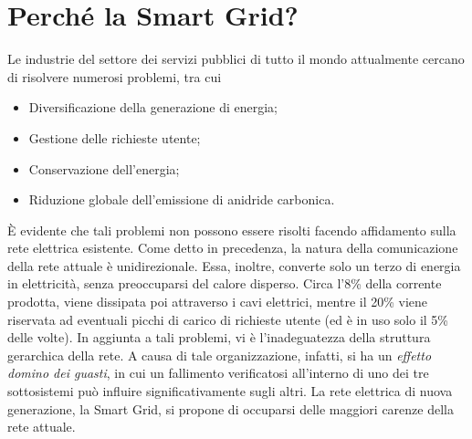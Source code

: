 \section{Perché la Smart Grid?}
Le industrie del settore dei servizi pubblici di tutto il mondo attualmente cercano di risolvere numerosi problemi, tra cui 
\begin{itemize}
\item Diversificazione della generazione di energia;
\item Gestione delle richieste utente;
\item Conservazione dell'energia;
\item Riduzione globale dell'emissione di anidride carbonica.
\end{itemize}
È evidente che tali problemi non possono essere risolti facendo affidamento sulla rete elettrica esistente. \newline
Come detto in precedenza, la natura della comunicazione della rete attuale è unidirezionale. Essa, inoltre, converte solo un terzo di energia in elettricità, senza preoccuparsi del calore disperso. Circa l'8\% della corrente prodotta, viene dissipata poi attraverso i cavi elettrici, mentre il 20\% viene riservata ad eventuali picchi di carico di richieste utente (ed è in uso solo il 5\% delle volte). \newline
In aggiunta a tali problemi, vi è l'inadeguatezza della struttura gerarchica della rete. A causa di tale organizzazione, infatti, si ha un \textit{effetto domino dei guasti}, in cui un fallimento verificatosi all'interno di uno dei tre sottosistemi può influire significativamente sugli altri. \newline
La rete elettrica di nuova generazione, la Smart Grid, si propone di occuparsi delle maggiori carenze della rete attuale.
\begin{figure}[h]
\end{figure}

